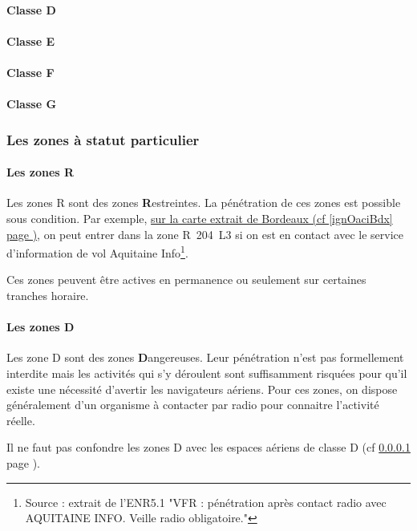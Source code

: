 		\paragraph{Classe D}\label{classeD}
		
		\paragraph{Classe E}
		
		\paragraph{Classe F}
		
		\paragraph{Classe G}
		
		\subsubsection{Les zones à statut particulier}
			\paragraph{Les zones R}
			Les zones R sont des zones \textbf{R}estreintes. La pénétration de ces zones est possible sous condition. Par exemple, \hyperlink{ignOaciBordeaux.1}{sur la carte extrait de Bordeaux (cf \ref{ignOaciBdx} page \pageref{ignOaciBdx})}, on peut entrer dans la zone R~204~L3 si on est en contact avec le service d'information de vol Aquitaine Info\footnote{Source : extrait de l'ENR5.1 "VFR : pénétration après contact radio avec AQUITAINE INFO. Veille radio obligatoire."}.
			
			Ces zones peuvent être actives en permanence ou seulement sur certaines tranches horaire.
			
			\paragraph{Les zones D}
			Les zone D sont des zones \textbf{D}angereuses. Leur pénétration n'est pas formellement interdite mais les activités qui s'y déroulent sont suffisamment risquées pour qu'il existe une nécessité d'avertir les navigateurs aériens. Pour ces zones, on dispose généralement d'un organisme à contacter par radio pour connaitre l'activité réelle.
			
			\alert{Il ne faut pas confondre les zones D avec les espaces aériens de classe D (cf \ref{classeD} page \pageref{classeD}}).
			
